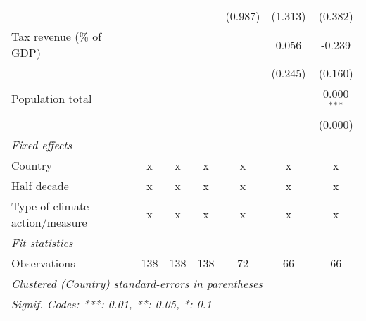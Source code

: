 \begin{tabular}{lcccccc}
                                                   &               &                &                & (0.987)        & (1.313)         & (0.382)\\   
   Tax revenue (\% of GDP)                         &               &                &                &                & 0.056           & -0.239\\   
                                                   &               &                &                &                & (0.245)         & (0.160)\\   
   Population total                                &               &                &                &                &                 & 0.000$^{***}$\\   
                                                   &               &                &                &                &                 & (0.000)\\   
   \emph{Fixed effects}\\
   Country                                         & x             & x              & x              & x              & x               & x\\  
   Half decade                                     & x             & x              & x              & x              & x               & x\\  
   Type of climate action/measure                  & x             & x              & x              & x              & x               & x\\  
   \midrule \emph{Fit statistics}\\
   Observations                                    & 138           & 138            & 138            & 72             & 66              & 66\\  
   \midrule
   \multicolumn{7}{l}{\emph{Clustered (Country) standard-errors in parentheses}}\\
   \multicolumn{7}{l}{\emph{Signif. Codes: ***: 0.01, **: 0.05, *: 0.1}}\\
\end{tabular}
\par\endgroup


